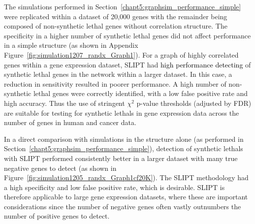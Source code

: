 


The simulations performed in Section~\ref{chapt5:graphsim_performance_simple} were replicated within a dataset of 20,000 genes with the remainder being composed of non-synthetic lethal genes without correlation structure. The specificity in a higher number of \gls{synthetic lethal} genes did not affect performance in a simple  structure (as shown in Appendix Figure~\ref{fig:simulation1207_randx_Graph1}). For a graph of highly correlated genes within a \gls{gene expression} dataset, \gls{SLIPT} had \textcolor{black}{high performance detecting} of \gls{synthetic lethal} genes in the network within a larger dataset. In this case, a reduction in sensitivity resulted in poorer performance. A high number of non-synthetic lethal genes were correctly identified, with a low false positive rate and high accuracy. Thus the use of stringent $\chi^2$ p-value thresholds (adjusted by \gls{FDR}) are suitable for testing for \glspl{synthetic lethal} in \gls{gene expression} data across the number of genes in human and cancer data.

In a direct comparison with simulations in the  structure alone (as performed in Section~\ref{chapt5:graphsim_performance_simple}), detection of \glspl{synthetic lethal} with \gls{SLIPT} performed consistently better in a larger dataset with many true negative genes to detect (as shown in Figure~\ref{fig:simulation1205_randx_Graph1cf20K}). The \gls{SLIPT} methodology had a high specificity and low false positive rate, which is desirable. \gls{SLIPT} is therefore applicable to large \gls{gene expression} datasets, where these are important considerations since the number of negative genes often vastly outnumbers the number of positive genes to detect.



